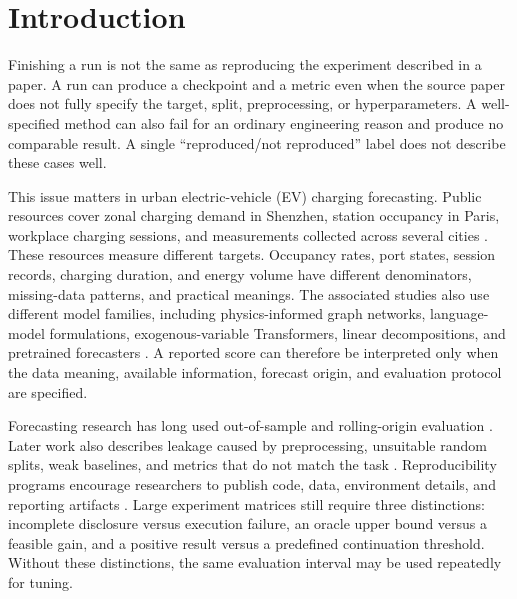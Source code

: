 \section{Introduction}
\label{sec:introduction}

Finishing a run is not the same as reproducing the experiment described in a paper.  A run can produce a checkpoint and a metric even when the source paper does not fully specify the target, split, preprocessing, or hyperparameters.  A well-specified method can also fail for an ordinary engineering reason and produce no comparable result.  A single ``reproduced/not reproduced'' label does not describe these cases well.

This issue matters in urban electric-vehicle (EV) charging forecasting.  Public resources cover zonal charging demand in Shenzhen, station occupancy in Paris, workplace charging sessions, and measurements collected across several cities \cite{li2025urbanev,amaraouali2024smarter,amaraouali2023parisdataset,lee2019acndata,guo2025charged}.  These resources measure different targets.  Occupancy rates, port states, session records, charging duration, and energy volume have different denominators, missing-data patterns, and practical meanings.  The associated studies also use different model families, including physics-informed graph networks, language-model formulations, exogenous-variable Transformers, linear decompositions, and pretrained forecasters \cite{qu2024pag,qu2024chatev,wang2024timexer,zeng2023dlinear,ansari2024chronos,ansari2025chronos2}.  A reported score can therefore be interpreted only when the data meaning, available information, forecast origin, and evaluation protocol are specified.

Forecasting research has long used out-of-sample and rolling-origin evaluation \cite{dawid1984prequential,tashman2000oos}.  Later work also describes leakage caused by preprocessing, unsuitable random splits, weak baselines, and metrics that do not match the task \cite{hewamalage2023pitfalls,kapoor2023leakage}.  Reproducibility programs encourage researchers to publish code, data, environment details, and reporting artifacts \cite{pineau2021reproducibility}.  Large experiment matrices still require three distinctions: incomplete disclosure versus execution failure, an oracle upper bound versus a feasible gain, and a positive result versus a predefined continuation threshold.  Without these distinctions, the same evaluation interval may be used repeatedly for tuning.


